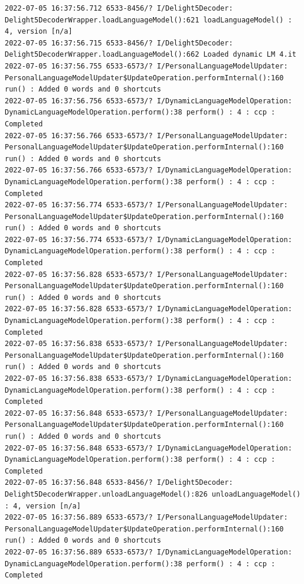 \documentclass[a4paper,12pt]{book}
\begin{document}
\begin{lstlisting}
2022-07-05 16:37:56.712 6533-8456/? I/Delight5Decoder: Delight5DecoderWrapper.loadLanguageModel():621 loadLanguageModel() : 4, version [n/a]
2022-07-05 16:37:56.715 6533-8456/? I/Delight5Decoder: Delight5DecoderWrapper.loadLanguageModel():662 Loaded dynamic LM 4.it
2022-07-05 16:37:56.755 6533-6573/? I/PersonalLanguageModelUpdater: PersonalLanguageModelUpdater$UpdateOperation.performInternal():160 run() : Added 0 words and 0 shortcuts
2022-07-05 16:37:56.756 6533-6573/? I/DynamicLanguageModelOperation: DynamicLanguageModelOperation.perform():38 perform() : 4 : ccp : Completed
2022-07-05 16:37:56.766 6533-6573/? I/PersonalLanguageModelUpdater: PersonalLanguageModelUpdater$UpdateOperation.performInternal():160 run() : Added 0 words and 0 shortcuts
2022-07-05 16:37:56.766 6533-6573/? I/DynamicLanguageModelOperation: DynamicLanguageModelOperation.perform():38 perform() : 4 : ccp : Completed
2022-07-05 16:37:56.774 6533-6573/? I/PersonalLanguageModelUpdater: PersonalLanguageModelUpdater$UpdateOperation.performInternal():160 run() : Added 0 words and 0 shortcuts
2022-07-05 16:37:56.774 6533-6573/? I/DynamicLanguageModelOperation: DynamicLanguageModelOperation.perform():38 perform() : 4 : ccp : Completed
2022-07-05 16:37:56.828 6533-6573/? I/PersonalLanguageModelUpdater: PersonalLanguageModelUpdater$UpdateOperation.performInternal():160 run() : Added 0 words and 0 shortcuts
2022-07-05 16:37:56.828 6533-6573/? I/DynamicLanguageModelOperation: DynamicLanguageModelOperation.perform():38 perform() : 4 : ccp : Completed
2022-07-05 16:37:56.838 6533-6573/? I/PersonalLanguageModelUpdater: PersonalLanguageModelUpdater$UpdateOperation.performInternal():160 run() : Added 0 words and 0 shortcuts
2022-07-05 16:37:56.838 6533-6573/? I/DynamicLanguageModelOperation: DynamicLanguageModelOperation.perform():38 perform() : 4 : ccp : Completed
2022-07-05 16:37:56.848 6533-6573/? I/PersonalLanguageModelUpdater: PersonalLanguageModelUpdater$UpdateOperation.performInternal():160 run() : Added 0 words and 0 shortcuts
2022-07-05 16:37:56.848 6533-6573/? I/DynamicLanguageModelOperation: DynamicLanguageModelOperation.perform():38 perform() : 4 : ccp : Completed
2022-07-05 16:37:56.848 6533-8456/? I/Delight5Decoder: Delight5DecoderWrapper.unloadLanguageModel():826 unloadLanguageModel() : 4, version [n/a]
2022-07-05 16:37:56.889 6533-6573/? I/PersonalLanguageModelUpdater: PersonalLanguageModelUpdater$UpdateOperation.performInternal():160 run() : Added 0 words and 0 shortcuts
2022-07-05 16:37:56.889 6533-6573/? I/DynamicLanguageModelOperation: DynamicLanguageModelOperation.perform():38 perform() : 4 : ccp : Completed

\end{lstlisting}
\end{document}
